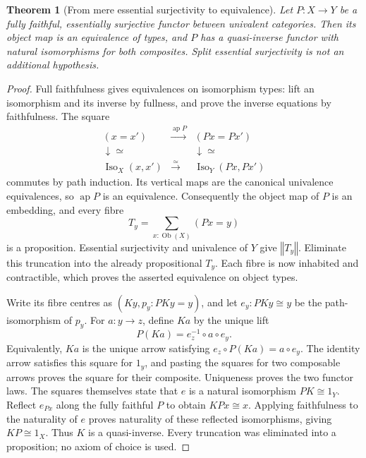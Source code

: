 \documentclass[11pt]{amsart}
\newtheorem{theorem}{Theorem}[section]
\theoremstyle{definition}
\theoremstyle{remark}
\newcommand{\Iso}{\operatorname{Iso}}
\newcommand{\Ob}{\operatorname{Ob}}
\newcommand{\tr}[1]{\left\Vert #1\right\Vert}
\begin{document}
\begin{theorem}[From mere essential surjectivity to equivalence]
\label{thm:weak-equivalence}
Let $P:X\to Y$ be a fully faithful, essentially surjective functor between
univalent categories. Then its object map is an equivalence of types,
and $P$ has a quasi-inverse functor with natural isomorphisms for both
composites. Split essential surjectivity is not an additional hypothesis.
\end{theorem}
\begin{proof}
Full faithfulness gives equivalences on isomorphism types: lift an
isomorphism and its inverse by fullness, and prove the inverse equations
by faithfulness. The square
\[
\begin{array}{ccc}
 (x=x')&\xrightarrow{\operatorname{ap}P}&(Px=Px')\\
 \downarrow\scriptstyle{\simeq}&&\downarrow\scriptstyle{\simeq}\\
 \Iso_X(x,x')&\xrightarrow{\simeq}&\Iso_Y(Px,Px')
\end{array}
\]
commutes by path induction. Its vertical maps are the canonical
univalence equivalences, so $\operatorname{ap}P$ is an equivalence.
Consequently the object map of $P$ is an embedding, and every fibre
\[
 T_y=\sum_{x:\Ob(X)}(Px=y)
\]
is a proposition. Essential surjectivity and univalence of $Y$ give
$\tr{T_y}$. Eliminate this truncation into the already propositional
$T_y$. Each fibre is now inhabited and contractible, which proves the
asserted equivalence on object types.

Write its fibre centres as $(Ky,p_y:PKy=y)$, and let
$e_y:PKy\cong y$ be the path-isomorphism of $p_y$. For $a:y\to z$,
define $Ka$ by the unique lift
\begin{equation}\label{eq:inverse-arrow}
 P(Ka)=e_z^{-1}\circ a\circ e_y.
\end{equation}
Equivalently, $Ka$ is the unique arrow satisfying
$e_z\circ P(Ka)=a\circ e_y$. The identity arrow satisfies this square
for $1_y$, and pasting the squares for two composable arrows proves the
square for their composite. Uniqueness proves the two functor laws.
The squares themselves state that $e$ is a natural isomorphism
$PK\cong1_Y$. Reflect $e_{Px}$ along the fully faithful $P$ to obtain
$KPx\cong x$. Applying faithfulness to the naturality of $e$ proves
naturality of these reflected isomorphisms, giving $KP\cong1_X$.
Thus $K$ is a quasi-inverse. Every truncation was eliminated into a
proposition; no axiom of choice is used.
\end{proof}
\end{document}
